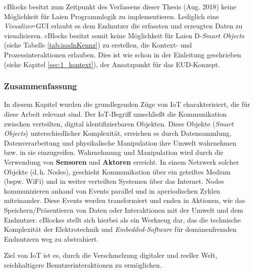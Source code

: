 \acp{cBlock} besitzt zum Zeitpunkt des Verfassens dieser Thesis (Aug. 2018) keine Möglichkeit für Laien Programmlogik zu implementieren. Lediglich eine \textit{Visualizer}-\acs{GUI} erlaubt es dem Endnutzer die erfassten und erzeugten Daten zu visualisieren. \acp{cBlock} besitzt somit keine Möglichkeit für Laien D-\textit{Smart Objects} (siehe Tabelle \ref{tab:isadnKennz}) zu erstellen, die Kontext- und Prozessinteraktionen erlauben. Dies ist wie schon in der Einleitung geschrieben (siehe Kapitel \ref{sec:1_kontext}), der Ansatzpunkt für das \ac{EUD}-Konzept.

\subsubsection*{Zusammenfassung}
In diesem Kapitel wurden die grundlegenden Züge von \ac{IoT} charakterisiert, die für diese Arbeit relevant sind. Der \ac{IoT}-Begriff umschließt die Kommunikation zwischen verteilten, digital identifizierbaren Objekten. Diese Objekte (\textit{Smart Objects}) unterschiedlicher Komplexität, erreichen es durch Datensammlung, Datenverarbeitung und physikalische Manipulation ihre Umwelt wahrnehmen bzw. in sie einzugreifen. Wahrnehmung und Manipulation wird durch die Verwendung von \textbf{Sensoren} und \textbf{Aktoren} erreicht. In einem Netzwerk solcher Objekte (d.\,h. Nodes), geschieht Kommunikation über ein geteiltes Medium (bspw. WiFi) und in weiter verteilten Systemen über das Internet. Nodes kommunizieren anhand von Events parallel und in aperiodischen Zyklen miteinander. Diese Events werden transformiert und enden in Aktionen, wie das Speichern/Präsentieren von Daten oder Interaktionen mit der Umwelt und dem Endnutzer. \acp{cBlocks} stellt sich hierbei als ein Werkzeug dar, das die technische Komplexität der Elektrotechnik und \textit{Embedded-Software} für domänenfremden Endnutzern weg zu abstrahiert.

Ziel von \ac{IoT} ist es, durch die Verschmelzung digitaler und reeller Welt, reichhaltigere Benutzerinteraktionen zu ermöglichen.
